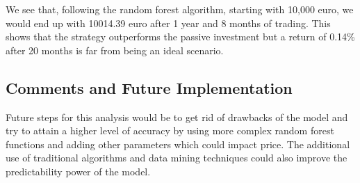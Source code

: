 \documentclass[
  11pt,
]{article}
\begin{document}
We see that, following the random forest algorithm, starting with 10,000
euro, we would end up with 10014.39 euro after 1 year and 8 months of
trading. This shows that the strategy outperforms the passive investment
but a return of 0.14\% after 20 months is far from being an ideal
scenario.

\hypertarget{comments-and-future-implementation}{%
\subsection{Comments and Future
Implementation}\label{comments-and-future-implementation}}

Future steps for this analysis would be to get rid of drawbacks of the
model and try to attain a higher level of accuracy by using more complex
random forest functions and adding other parameters which could impact
price. The additional use of traditional algorithms and data mining
techniques could also improve the predictability power of the model.

\newpage

\renewcommand\refname{References}
  
\end{document}
